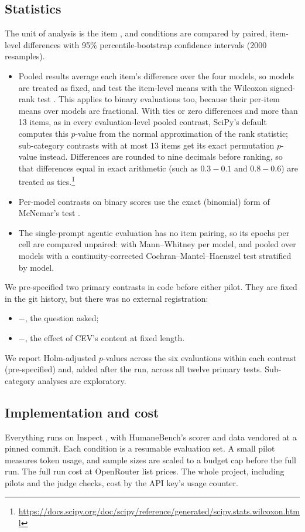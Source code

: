 \subsection{Statistics}
The unit of analysis is the item \citep{miller2024errorbars}, and conditions are compared by paired, item-level
differences with 95\% percentile-bootstrap confidence intervals (2000 resamples).
\begin{itemize}
  \item Pooled results average each item's difference over the four models, so models are treated as fixed, and
  test the item-level means with the Wilcoxon signed-rank test \citep{wilcoxon1945}. This applies to binary
  evaluations too, because their per-item means over models are fractional. With ties or zero differences and more
  than 13 items, as in every evaluation-level pooled contrast, SciPy's default computes this $p$-value from the normal
  approximation of the rank statistic; sub-category contrasts with at most 13 items get its exact permutation
  $p$-value instead. Differences are rounded to nine decimals before ranking, so that differences equal in exact
  arithmetic (such as $0.3-0.1$ and $0.8-0.6$) are treated as ties.\footnote{\url{https://docs.scipy.org/doc/scipy/reference/generated/scipy.stats.wilcoxon.html}}
  \item Per-model contrasts on binary scores use the exact (binomial) form of McNemar's test \citep{mcnemar1947}.
  \item The single-prompt agentic evaluation has no item pairing, so its \RAmEpochs{} epochs per cell are compared
  unpaired: with Mann--Whitney per model, and pooled over models with a continuity-corrected Cochran--Mantel--Haenszel
  test stratified by model.
\end{itemize}
We pre-specified two primary contrasts in code before either pilot. They are fixed in the git history, but there was
no external registration:
\begin{itemize}
  \item {}$-$, the question asked;
  \item {}$-$, the effect of CEV's content at fixed length.
\end{itemize}
We report Holm-adjusted $p$-values \citep{holm1979} across the six evaluations within each contrast (pre-specified)
and, added after the run, across all twelve primary tests. Sub-category analyses are exploratory.

\subsection{Implementation and cost}
Everything runs on Inspect \citep{inspect2024}, with HumaneBench's scorer and data vendored at a pinned commit. Each
condition is a resumable evaluation set. A small pilot measures token usage, and sample sizes are scaled to a budget
cap before the full run. The full run cost \RCostFullRun{} at OpenRouter list prices. The whole project, including
pilots and the judge checks, cost \RCostTotal{} by the API key's usage counter.

